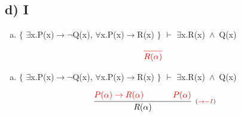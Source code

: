 \documentclass[aspectratio=43]{beamer}
\newcommand{\ria}{$\rightarrow$}
\newcommand{\fall}{$\forall$}
\newcommand{\ex}{$\exists$}
\newcommand{\nao}{$\neg$}
\newcommand{\andd}{$\wedge$}
\begin{document}
    \subsection{d) I}
    
    \begin{frame}[fragile]
    
    	\begin{enumerate}[d)]
			\item $\{$ \ex x.P(x)\ria \nao Q(x), \fall x.P(x)\ria R(x) $\}$ $\vdash$ \ex x.R(x)\ \andd\ Q(x) \\
		\end{enumerate}
        
        \vspace{80pt}
        
        \[
        \begin{array}{c}
		
        	\textcolor{red}{
            \infer[_{}]
            	{R(\alpha)}
            	{}
        	}
		\end{array}
        \]
        
	\end{frame}
    
    \begin{frame}[fragile]
    
    	\begin{enumerate}[d)]
			\item $\{$ \ex x.P(x)\ria \nao Q(x), \fall x.P(x)\ria R(x) $\}$ $\vdash$ \ex x.R(x)\ \andd\ Q(x) \\
		\end{enumerate}
        
        \vspace{75pt}
        
        \[
        \begin{array}{c}
		
        	\infer[_{(\textcolor{red}{\to -I})}]
            	{R(\alpha)}
            	{\textcolor{red}{P(\alpha) \rightarrow R(\alpha)} \hspace{35pt} \textcolor{red}{P(\alpha)}}
		\end{array}
        \]
        
	\end{frame}
    
    
    
\end{document}
